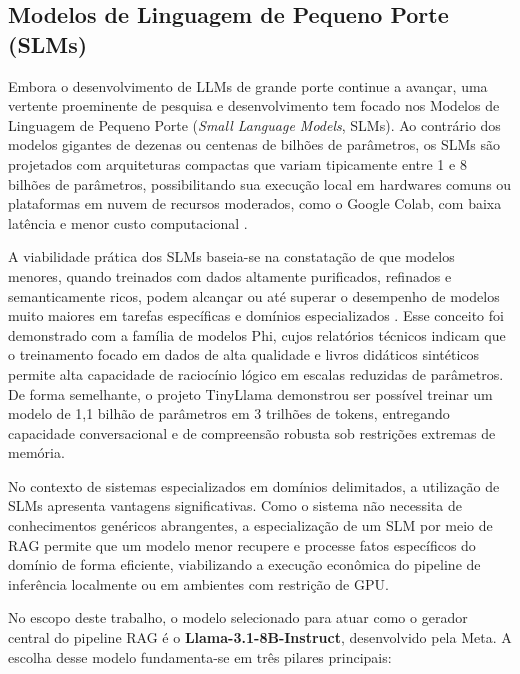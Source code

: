 \documentclass[
	12pt,				%
	openright,			%
	oneside,			%
	a4paper,			%
	tccpreliminar,		%
	]{ABNT-DC-UEL}
\begin{document}
\subsection{Modelos de Linguagem de Pequeno Porte (SLMs)}

Embora o desenvolvimento de LLMs de grande porte continue a avançar, uma vertente proeminente de pesquisa e desenvolvimento tem focado nos Modelos de Linguagem de Pequeno Porte (\textit{Small Language Models}, SLMs). Ao contrário dos modelos gigantes de dezenas ou centenas de bilhões de parâmetros, os SLMs são projetados com arquiteturas compactas que variam tipicamente entre 1 e 8 bilhões de parâmetros, possibilitando sua execução local em hardwares comuns ou plataformas em nuvem de recursos moderados, como o Google Colab, com baixa latência e menor custo computacional \cite{abdin2024phi}.

A viabilidade prática dos SLMs baseia-se na constatação de que modelos menores, quando treinados com dados altamente purificados, refinados e semanticamente ricos, podem alcançar ou até superar o desempenho de modelos muito maiores em tarefas específicas e domínios especializados \cite{abdin2024phi}. Esse conceito foi demonstrado com a família de modelos Phi, cujos relatórios técnicos indicam que o treinamento focado em dados de alta qualidade e livros didáticos sintéticos permite alta capacidade de raciocínio lógico em escalas reduzidas de parâmetros. De forma semelhante, o projeto TinyLlama \cite{zhang2024tinyllama} demonstrou ser possível treinar um modelo de 1,1 bilhão de parâmetros em 3 trilhões de tokens, entregando capacidade conversacional e de compreensão robusta sob restrições extremas de memória.

No contexto de sistemas especializados em domínios delimitados, a utilização de SLMs apresenta vantagens significativas. Como o sistema não necessita de conhecimentos genéricos abrangentes, a especialização de um SLM por meio de RAG permite que um modelo menor recupere e processe fatos específicos do domínio de forma eficiente, viabilizando a execução econômica do pipeline de inferência localmente ou em ambientes com restrição de GPU.

No escopo deste trabalho, o modelo selecionado para atuar como o gerador central do pipeline RAG é o \textbf{Llama-3.1-8B-Instruct}, desenvolvido pela Meta. A escolha desse modelo fundamenta-se em três pilares principais:
\end{document}
